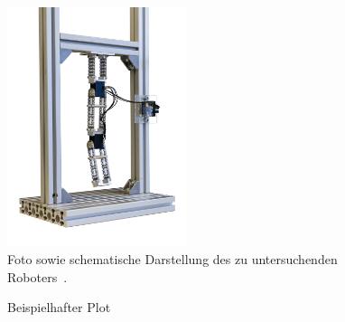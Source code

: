 \documentclass{MSM_latex}
\begin{document}
\clearpage


\begin{figure}[t]
	\centering
	\includegraphics[height=7cm]{img/Versuchsaufbau.png}
	\hspace{1cm}
	\def\svgwidth{5.5cm}
	
	\caption{Foto sowie schematische Darstellung des zu untersuchenden Roboters~\cite{Fuchs23}.}
	\label{fig:Roboter}
\end{figure}

\def\myLineWidth{1.5pt}

%
% 
\begin{figure}[t]
	\centering
	
	\caption{Beispielhafter Plot}
	\label{fig:plot_example}
\end{figure}



\end{document}
